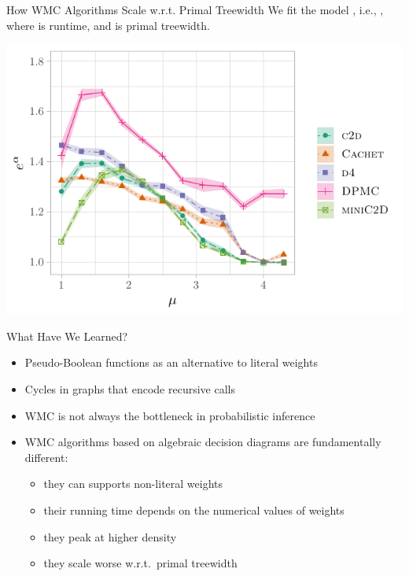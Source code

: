 \documentclass{beamer}
\begin{document}
 \begin{frame}{How WMC Algorithms Scale w.r.t. Primal Treewidth}
  We fit the model , i.e.,
  , where  is
  \alert{runtime}, and  is \alert{primal treewidth}.

  \centering
  \includegraphics{linearbase.pdf}
\end{frame}

\begin{frame}{What Have We Learned?}
  \begin{itemize}
    \item Pseudo-Boolean functions as an alternative to literal weights
    \item Cycles in graphs that encode recursive calls
    \item WMC is not always the bottleneck in probabilistic inference
    \item WMC algorithms based on algebraic decision diagrams are fundamentally different:
    \begin{itemize}
      \item they can supports non-literal weights
      \item their running time depends on the numerical values of weights
      \item they peak at higher density
      \item they scale worse w.r.t.\ primal treewidth
    \end{itemize}
  \end{itemize}
\end{frame}

\end{document}
